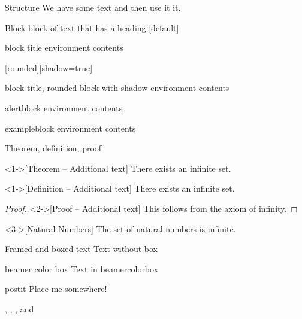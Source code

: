 \begin{frame}{Structure}
  We have some text and then use  it it.
\end{frame}

\begin{frame}{Block}
  block of text that has a heading
  [default]
  \begin{block}{block title}
  environment contents
  \end{block}
  [rounded][shadow=true]
  \begin{block}{block title, rounded block with shadow}
  environment contents
  \end{block}
  \begin{alertblock}{alertblock}
  environment contents
  \end{alertblock}
  \begin{exampleblock}{exampleblock}
  environment contents
  \end{exampleblock}
\end{frame}


\begin{frame}{Theorem, definition, proof}
  \begin{theorem}<1->[Theorem – Additional text]
  There exists an infinite set.
  \end{theorem}
  \begin{definition}<1->[Definition – Additional text]
  There exists an infinite set.
  \end{definition}
  \begin{proof}<2->[Proof – Additional text]
  This follows from the axiom of infinity.
  \end{proof}
  \begin{example}<3->[Natural Numbers]
  The set of natural numbers is infinite.
  \end{example}
\end{frame}




\begin{frame}{Framed and boxed text}
  Text without box
  \begin{beamercolorbox}{beamer color box}
    Text in beamercolorbox
  \end{beamercolorbox}
  
  \begin{beamercolorbox}[sep=1em,wd=5cm]{postit}
    Place me somewhere!
  \end{beamercolorbox}
  
  , , , and 
\end{frame}


